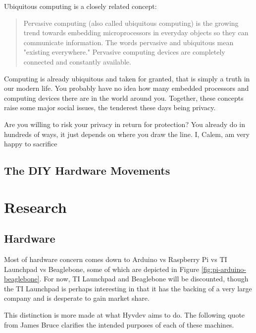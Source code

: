		Ubiquitous computing is a closely related concept:
		\begin{quote}
			Pervasive computing (also called ubiquitous computing) is the growing trend towards embedding microprocessors in everyday objects so they can communicate information.  The words pervasive and ubiquitous mean "existing everywhere." Pervasive computing devices are completely connected and constantly available. 
		\end{quote}
		
		Computing is already ubiquitous and taken for granted, that is simply a truth in our modern life.
		You probably have no idea how many embedded processors and computing devices there are in the world around you.
		Together, these concepts raise some major social issues, the tenderest these days being privacy.
		
		Are you willing to risk your privacy in return for protection?
		You already do in hundreds of ways, it just depends on where you draw the line.
		I, Calem, am very happy to sacrifice 
	
	\subsection{The DIY Hardware Movements}

\section{Research}

	\subsection{Hardware}
	
		Most of hardware concern comes down to Arduino vs Raspberry Pi vs TI Launchpad vs Beaglebone, some of which are depicted in Figure \ref{fig:pi-arduino-beaglebone}. 
		For now, TI Launchpad and Beaglebone will be discounted, though the TI Launchpad is perhaps interesting in that it has the backing of a very large company and is desperate to gain market share.
		
		This distinction is more made at what Hyvdev aims to do.
		The following quote from James Bruce clarifies the intended purposes of each of these machines.
		
